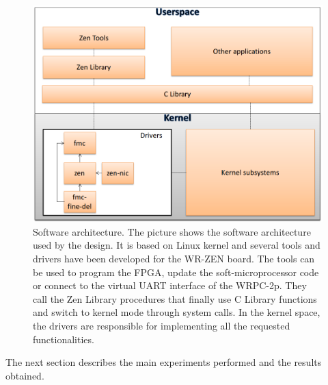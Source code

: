 \begin{figure}[H]
	\centering
	\includegraphics[scale=0.4]{img/software_architecture}
	\caption{Software architecture. The picture shows the software architecture
		used by the design. It is based on Linux kernel and several tools and drivers
		have been developed for the WR-ZEN board. The tools can be used to program 
		the FPGA, update the soft-microprocessor code or connect to the virtual UART
		interface of the WRPC-2p. They call the Zen Library procedures that finally
		use C Library functions and switch to kernel mode through system calls. In the
		kernel space, the drivers are responsible for implementing all the requested 
		functionalities. }
	\label{fig:software_architecture}
\end{figure}

The next section describes the main experiments performed and the results obtained.

